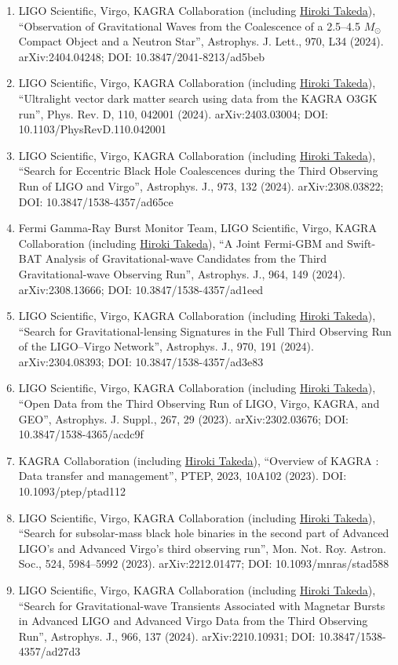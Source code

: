 \documentclass[uplatex, 12pt]{article}
\begin{document}
\begin{enumerate}
\item LIGO Scientific, Virgo, KAGRA Collaboration (including \uline{Hiroki Takeda}), “Observation of Gravitational Waves from the Coalescence of a 2.5--4.5 $M_{\odot}$ Compact Object and a Neutron Star”, Astrophys. J. Lett., 970, L34 (2024). arXiv:2404.04248; DOI: 10.3847/2041-8213/ad5beb
\item LIGO Scientific, Virgo, KAGRA Collaboration (including \uline{Hiroki Takeda}), “Ultralight vector dark matter search using data from the KAGRA O3GK run”, Phys. Rev. D, 110, 042001 (2024). arXiv:2403.03004; DOI: 10.1103/PhysRevD.110.042001
\item LIGO Scientific, Virgo, KAGRA Collaboration (including \uline{Hiroki Takeda}), “Search for Eccentric Black Hole Coalescences during the Third Observing Run of LIGO and Virgo”, Astrophys. J., 973, 132 (2024). arXiv:2308.03822; DOI: 10.3847/1538-4357/ad65ce
\item Fermi Gamma-Ray Burst Monitor Team, LIGO Scientific, Virgo, KAGRA Collaboration (including \uline{Hiroki Takeda}), “A Joint Fermi-GBM and Swift-BAT Analysis of Gravitational-wave Candidates from the Third Gravitational-wave Observing Run”, Astrophys. J., 964, 149 (2024). arXiv:2308.13666; DOI: 10.3847/1538-4357/ad1eed
\item LIGO Scientific, Virgo, KAGRA Collaboration (including \uline{Hiroki Takeda}), “Search for Gravitational-lensing Signatures in the Full Third Observing Run of the LIGO--Virgo Network”, Astrophys. J., 970, 191 (2024). arXiv:2304.08393; DOI: 10.3847/1538-4357/ad3e83
\item LIGO Scientific, Virgo, KAGRA Collaboration (including \uline{Hiroki Takeda}), “Open Data from the Third Observing Run of LIGO, Virgo, KAGRA, and GEO”, Astrophys. J. Suppl., 267, 29 (2023). arXiv:2302.03676; DOI: 10.3847/1538-4365/acdc9f
\item KAGRA Collaboration (including \uline{Hiroki Takeda}), “Overview of KAGRA : Data transfer and management”, PTEP, 2023, 10A102 (2023). DOI: 10.1093/ptep/ptad112
\item LIGO Scientific, Virgo, KAGRA Collaboration (including \uline{Hiroki Takeda}), “Search for subsolar-mass black hole binaries in the second part of Advanced LIGO's and Advanced Virgo's third observing run”, Mon. Not. Roy. Astron. Soc., 524, 5984--5992 (2023). arXiv:2212.01477; DOI: 10.1093/mnras/stad588
\item LIGO Scientific, Virgo, KAGRA Collaboration (including \uline{Hiroki Takeda}), “Search for Gravitational-wave Transients Associated with Magnetar Bursts in Advanced LIGO and Advanced Virgo Data from the Third Observing Run”, Astrophys. J., 966, 137 (2024). arXiv:2210.10931; DOI: 10.3847/1538-4357/ad27d3

\end{enumerate}
\end{document}

